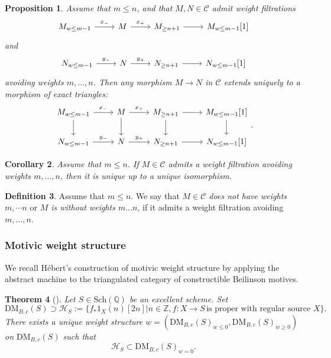 \documentclass[11pt, a4paper]{amsart}
\theoremstyle{plain}
\newtheorem{theorem}{Theorem}[section]
\newtheorem{corollary}[theorem]{Corollary}
\newtheorem{proposition}[theorem]{Proposition}
\theoremstyle{definition}
\newtheorem{definition}[theorem]{Definition}
\numberwithin{equation}{section}
\def\QQ{\mathbb{Q}}
\def\ZZ{\mathbb{Z}}
\begin{document}
\begin{proposition}
    Assume that $m \le n$, and that $M, N \in \mathcal{C}$ admit weight filtrations
    \[
        \begin{tikzcd}
             M_{w \le m - 1} \ar[r, "{x_{-}}"] & M \ar[r, "{x_{+}}"] & M_{\ge n + 1} \ar[r] & {M_{w \le m - 1}[1]}
        \end{tikzcd}
    \]
    and 
    \[
        \begin{tikzcd}
             N_{w \le m - 1} \ar[r, "{y_{-}}"] & N \ar[r, "{y_{+}}"] & N_{\ge n + 1} \ar[r] & {N_{w \le m - 1}[1]}
        \end{tikzcd}
    \]
    avoiding weights $m, \ldots, n$. Then any morphism $M \rightarrow N$ in $\mathcal{C}$ extends uniquely to a morphism of exact triangles: 
    \[
        \begin{tikzcd}
             M_{w \le m - 1} \ar[r, "{x_{-}}"] \ar[d] & M \ar[r, "{x_{+}}"] \ar[d] & M_{\ge n + 1} \ar[r] \ar[d] & {M_{w \le m - 1}[1]} \ar[d] \\
             N_{w \le m - 1} \ar[r, "{y_{-}}"] & N \ar[r, "{y_{+}}"] & N_{\ge n + 1} \ar[r] & {N_{w \le m - 1}[1]}
        \end{tikzcd}.
    \]
\end{proposition}

\begin{corollary}
    Assume that $m \le n$. If $M \in \mathcal{C}$ admits a weight filtration avoiding weights $m, \ldots, n$, then it is unique up to a unique isomorphism. 
\end{corollary}

\begin{definition}
    Assume that $m \le n$. We say that \textit{$M \in \mathcal{C}$ does not have weights $m, \cdots n$} or \textit{$M$ is without weights $m \ldots n$}, if it admits a weight filtration avoiding $m, \ldots, n$. 
\end{definition}

\subsubsection{Motivic weight structure}

We recall H\'{e}bert's construction of motivic weight structure by applying the abstract machine to the triangulated category of constructible Beilinson motives. 

\begin{theorem}[{\cite[Th\'{e}or\`{e}me 3.3]{Hebert10}}]
    Let $S \in \mathrm{Sch}(\QQ)$ be an excellent scheme. 
    Set
    \begin{equation*}
        \mathrm{DM}_{B, c}(S) \supset \mathcal{H}_{S}:= \{ f_{*} 1_{X}(n)[2n] | n \in \ZZ, f \colon X \rightarrow S \, \text{is proper with regular source $X$} \}.
    \end{equation*}
    There exists a unique weight structure $w = (\mathrm{DM}_{B, c}(S)_{w \le 0}, \mathrm{DM}_{B, c}(S)_{w \ge 0})$ on $\mathrm{DM}_{B, c}(S)$ such that 
    \begin{equation*}
        \mathcal{H}_{S} \subset \mathrm{DM}_{B, c}(S)_{w = 0}. 
    \end{equation*}
\end{theorem}
\end{document}

